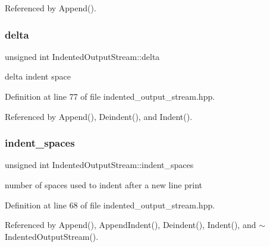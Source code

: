 Referenced by Append().

\mbox{\label{classIndentedOutputStream_a11915e0d1ac091ecc3205d71ebc493b6}} 
\subsubsection{\texorpdfstring{delta}{delta}}
{\footnotesize\ttfamily unsigned int Indented\+Output\+Stream\+::delta\hspace{0.3cm}{\ttfamily [private]}}



delta indent space 



Definition at line 77 of file indented\+\_\+output\+\_\+stream.\+hpp.



Referenced by Append(), Deindent(), and Indent().

\mbox{\label{classIndentedOutputStream_a92659187ef6887c07649ae881465ddc4}} 
\subsubsection{\texorpdfstring{indent\+\_\+spaces}{indent\_spaces}}
{\footnotesize\ttfamily unsigned int Indented\+Output\+Stream\+::indent\+\_\+spaces\hspace{0.3cm}{\ttfamily [private]}}



number of spaces used to indent after a new line print 



Definition at line 68 of file indented\+\_\+output\+\_\+stream.\+hpp.



Referenced by Append(), Append\+Indent(), Deindent(), Indent(), and $\sim$\+Indented\+Output\+Stream().

\mbox{\label{classIndentedOutputStream_ae7357f8c2e52afda355d4e240de611b4}} 
